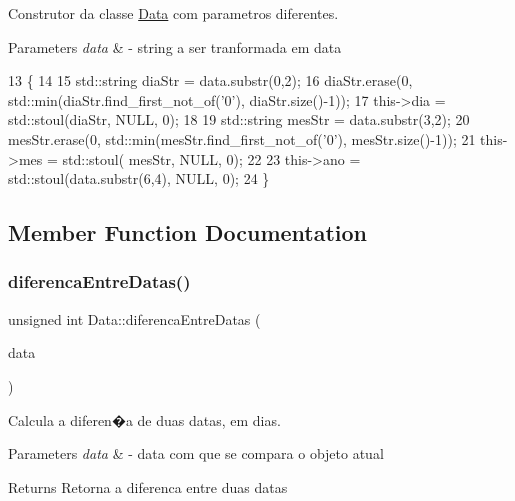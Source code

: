 Construtor da classe \hyperlink{classData}{Data} com parametros diferentes. 


\begin{DoxyParams}{Parameters}
{\em data} & -\/ string a ser tranformada em data \\
\hline
\end{DoxyParams}

\begin{DoxyCode}
13                          \{
14 
15     std::string diaStr = data.substr(0,2);
16     diaStr.erase(0, std::min(diaStr.find\_first\_not\_of(\textcolor{charliteral}{'0'}), diaStr.size()-1));
17     this->dia = std::stoul(diaStr, NULL, 0);
18 
19     std::string mesStr = data.substr(3,2);
20         mesStr.erase(0, std::min(mesStr.find\_first\_not\_of(\textcolor{charliteral}{'0'}), mesStr.size()-1));
21     this->mes = std::stoul( mesStr, NULL, 0);
22 
23     this->ano = std::stoul(data.substr(6,4), NULL, 0);
24 \}
\end{DoxyCode}


\subsection{Member Function Documentation}
\mbox{\label{classData_a495d15dd0d90b595740f6e09fd0a2177}} 
\subsubsection{\texorpdfstring{diferenca\+Entre\+Datas()}{diferencaEntreDatas()}}
{\footnotesize\ttfamily unsigned int Data\+::diferenca\+Entre\+Datas (\begin{DoxyParamCaption}\item[{const \hyperlink{classData}{Data} \&}]{data }\end{DoxyParamCaption})}



Calcula a diferen�a de duas datas, em dias. 


\begin{DoxyParams}{Parameters}
{\em data} & -\/ data com que se compara o objeto atual \\
\hline
\end{DoxyParams}
\begin{DoxyReturn}{Returns}
Retorna a diferenca entre duas datas 
\end{DoxyReturn}

